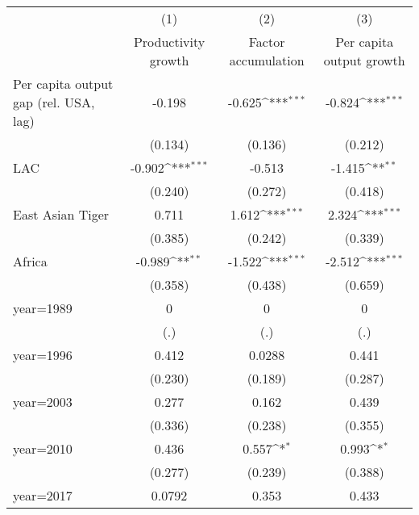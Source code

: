 {
\def\sym#1{\ifmmode^{#1}\else\(^{#1}\)\fi}
\begin{tabular}{l*{3}{c}}
\hline\hline
                    &\multicolumn{1}{c}{(1)}&\multicolumn{1}{c}{(2)}&\multicolumn{1}{c}{(3)}\\
                    &\multicolumn{1}{c}{Productivity growth}&\multicolumn{1}{c}{Factor accumulation}&\multicolumn{1}{c}{Per capita output growth}\\
\hline
Per capita output gap (rel. USA, lag)&      -0.198         &      -0.625\sym{***}&      -0.824\sym{***}\\
                    &     (0.134)         &     (0.136)         &     (0.212)         \\
[1em]
LAC                 &      -0.902\sym{***}&      -0.513         &      -1.415\sym{**} \\
                    &     (0.240)         &     (0.272)         &     (0.418)         \\
[1em]
East Asian Tiger    &       0.711         &       1.612\sym{***}&       2.324\sym{***}\\
                    &     (0.385)         &     (0.242)         &     (0.339)         \\
[1em]
Africa              &      -0.989\sym{**} &      -1.522\sym{***}&      -2.512\sym{***}\\
                    &     (0.358)         &     (0.438)         &     (0.659)         \\
[1em]
year=1989           &           0         &           0         &           0         \\
                    &         (.)         &         (.)         &         (.)         \\
[1em]
year=1996           &       0.412         &      0.0288         &       0.441         \\
                    &     (0.230)         &     (0.189)         &     (0.287)         \\
[1em]
year=2003           &       0.277         &       0.162         &       0.439         \\
                    &     (0.336)         &     (0.238)         &     (0.355)         \\
[1em]
year=2010           &       0.436         &       0.557\sym{*}  &       0.993\sym{*}  \\
                    &     (0.277)         &     (0.239)         &     (0.388)         \\
[1em]
year=2017           &      0.0792         &       0.353         &       0.433         \\

\end{tabular}}
